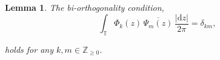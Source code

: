\documentclass[a4paper,10pt,leqno]{amsart}
\numberwithin{equation}{section}
\newtheorem{lemma}[theorem]{Lemma}
\theoremstyle{remark}
\newcommand{\dd}{\mathrm{d}}
\newcommand{\Z}{\mathbb{Z}}
\newcommand{\TT}{\mathbb{T}}
\newcommand{\ip}[2]{\langle #1, #2 \rangle}
\newcommand{\red}[1]{{\color{red} #1}}
\begin{document}
\begin{lemma} \label{lem: orth + degeneration}
The bi-orthogonality condition,
\begin{equation}\label{eq:biorth}
\int_{\TT} \Phi_k(z) \, \overline{\Psi_{m}(z)} \, \frac{|\dd z|}{2\pi} = \delta_{km},
\end{equation}

holds for any $k,m \in \Z_{\geq 0}$. 

\end{lemma}



\end{document}
